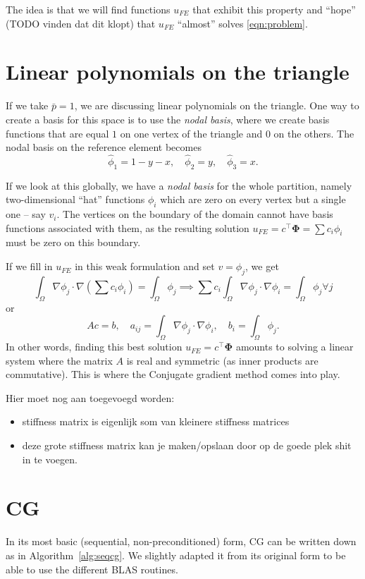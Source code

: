\documentclass[11pt]{amsart}
\theoremstyle{definition}
\begin{document}
The idea is that we will find functions $u_{FE}$ that exhibit this property and ``hope'' (TODO vinden dat dit klopt) that $u_{FE}$ ``almost'' solves \eqref{eqn:problem}.

\section{Linear polynomials on the triangle}
If we take $\bar p=1$, we are discussing linear polynomials on the triangle. One way to create a basis for this space is to use the \emph{nodal basis}, where we create basis functions that are equal $1$ on one vertex of the triangle and $0$ on the others. The nodal basis on the reference element becomes
\[
  \hat \phi_1 = 1-y-x, \quad \hat \phi_2 = y, \quad \hat \phi_3 = x.
\]

If we look at this globally, we have a \emph{nodal basis} for the whole partition, namely two-dimensional ``hat'' functions $\phi_i$ which are zero on every vertex but a single one -- say $v_i$. The vertices on the boundary of the domain cannot have basis functions associated with them, as the resulting solution $u_{FE} = c^\top \mathbf \Phi = \sum c_i \phi_i$ must be zero on this boundary.

If we fill in $u_{FE}$ in this weak formulation and set $v = \phi_j$, we get
\[
  \int_\Omega \nabla \phi_j \cdot \nabla \left (\sum c_i \phi_i\right) = \int_\Omega \phi_j \implies \sum c_i \int_\Omega \nabla \phi_j \cdot \nabla \phi_i = \int_\Omega \phi_j \forall j
\]
or
\[
  Ac = b, \quad a_{ij} = \int_\Omega \nabla \phi_j \cdot \nabla \phi_i, \quad b_i = \int_\Omega \phi_j.
\]
In other words, finding this best solution $u_{FE} = c^\top \mathbf \Phi$ amounts to solving a linear system where the matrix $A$ is real and symmetric (as inner products are commutative). This is where the Conjugate gradient method comes into play.

Hier moet nog aan toegevoegd worden:
\begin{itemize}
  \item stiffness matrix is eigenlijk som van kleinere stiffness matrices
  \item deze grote stiffness matrix kan je maken/opslaan door op de goede plek shit in te voegen.
\end{itemize}


\section{CG}
In its most basic (sequential, non-preconditioned) form, CG can be written down as in Algorithm~\ref{alg:seqcg}. \cite[Alg.~4.8]{biss04} We slightly adapted it from its original form to be able to use the different BLAS routines.
\end{document}

